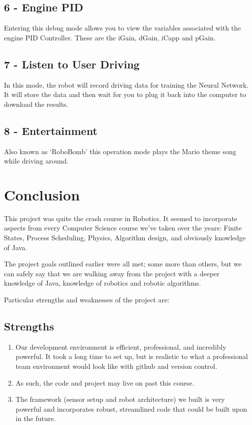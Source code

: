 \documentclass[12pt]{article}
\begin{document}
\subsection*{6 - Engine PID}
Entering this debug mode allows you to view the variables associated with the engine PID Controller.  These are the iGain, dGain, iCapp and pGain.

\subsection*{7 - Listen to User Driving}
In this mode, the robot will record driving data for training the Neural Network.  It will store the data and then wait for you to plug it back into the computer to download the results.

\subsection*{8 - Entertainment}
Also known as `RoboBomb' this operation mode plays the Mario theme song while driving around.


\clearpage
\section{Conclusion}
This project was quite the crash course in Robotics.  It seemed to incorporate aspects from every Computer Science course we've taken over the years: Finite States, Process Scheduling, Physics, Algorithm design, and obviously knowledge of Java.

The project goals outlined earlier were all met; some more than others, but we can safely say that we are walking away from the project with a deeper knowledge of Java, knowledge of robotics and robotic algorithms.

Particular strengths and weaknesses of the project are:

\subsection{Strengths}
\begin{enumerate}
\item Our development environment is efficient, professional, and incredibly powerful.  It took a long time to set up, but is realistic to what a professional team environment would look like with github and version control.
\item As such, the code and project may live on past this course.
\item The framework (sensor setup and robot architecture) we built is very powerful and incorporates robust, streamlined code that could be built upon in the future.
\end{enumerate}
\end{document}
